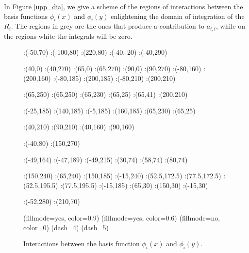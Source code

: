 In Figure \ref{upp_dia}, we give a scheme of the regions of interactions between the basis functions $\phi_i(x)$ and $\phi_i(y)$ enlightening the domain of integration of the $R_i$. The regions in grey are the ones that produce a contribution to $a_{i,i}$, while on the regions white the integrals will be zero.
\begin{figure}
\figinit{0.8pt}
:(-50,70)
:(-100,80) :(220,80)
:(-40,-20) :(-40,290)

:(40,0) :(40,270)
:(65,0) :(65,270)
:(90,0) :(90,270)
%
:(-80,160) :(200,160)
:(-80,185) :(200,185)
:(-80,210) :(200,210)

:(65,250) :(65,250)
:(65,230) :(65,25)
:(65,41) :(200,210)

:(-25,185) :(140,185)
:(-5,185) :(160,185)
:(65,230) :(65,25)

%

:(40,210) :(90,210)
:(40,160) :(90,160)

:(-40,80) :(150,270)

:(-49,164) :(-47,189) :(-49,215) 
:(30,74) :(58,74) :(80,74) 

:(150,240) :(65,240) :(150,185) 
:(-15,240) :(52.5,172.5) :(77.5,172.5) 
:(52.5,195.5) :(77.5,195.5) :(-15,185) 
:(65,30) :(150,30) :(-15,30) 

:(-52,280) :(210,70)


\figdrawbegin{}

\figset(fillmode=yes, color=0.9)
\figdrawline[29,30,10,6,29]
\figdrawline[30,32,12,16,30]
\figdrawline[32,31,5,9,32]
\figdrawline[31,11,15,29,31]
\figset(fillmode=yes, color=0.6)
\figdrawline[29,30,32,31,29]
\figset(fillmode=no, color=0)
\figdrawarrow[1,2]
\figdrawarrow[3,4]
\figdrawline[5,6]
\figdrawline[9,10]
\figdrawline[11,12]
\figdrawline[15,16]
\figset(dash=4)
\figdrawline[7,56]
\figdrawline[57,55]
\figdrawline[53,8]
\figdrawline[13,59]
\figdrawline[60,61]
\figdrawline[62,14]
\figset(dash=5)
\figdrawline[33,34]
\figdrawend

\centerline{\box\figBoxA}
\caption{Interactions between the basis function $\phi_i(x)$ and $\phi_i(y)$.}\label{dia}
\end{figure}
